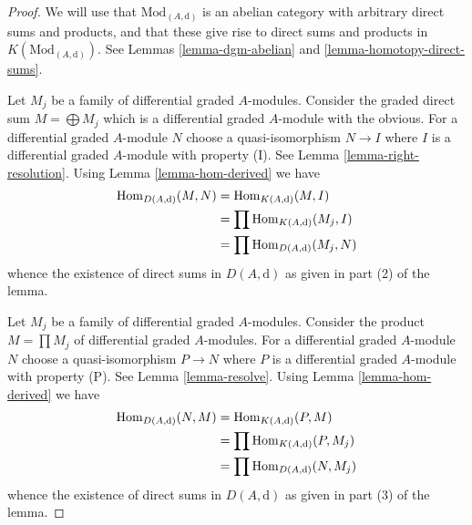 \begin{proof}
We will use that $\text{Mod}_{(A, \text{d})}$ is an abelian category
with arbitrary direct sums and products, and that these give rise
to direct sums and products in $K(\text{Mod}_{(A, \text{d})})$.
See Lemmas \ref{lemma-dgm-abelian} and \ref{lemma-homotopy-direct-sums}.

\medskip\noindent
Let $M_j$ be a family of differential graded $A$-modules.
Consider the graded direct sum $M = \bigoplus M_j$ which is a
differential graded $A$-module with the obvious.
For a differential graded $A$-module $N$ choose a quasi-isomorphism
$N \to I$ where $I$ is a differential graded $A$-module with property (I).
See Lemma \ref{lemma-right-resolution}.
Using Lemma \ref{lemma-hom-derived} we have
\begin{align*}
\mathop{\mathrm{Hom}}\nolimits_{D(A, \text{d})}(M, N)
& =
\mathop{\mathrm{Hom}}\nolimits_{K(A, \text{d})}(M, I) \\
& =
\prod \mathop{\mathrm{Hom}}\nolimits_{K(A, \text{d})}(M_j, I) \\
& =
\prod \mathop{\mathrm{Hom}}\nolimits_{D(A, \text{d})}(M_j, N)
\end{align*}
whence the existence of direct sums in $D(A, \text{d})$ as given in
part (2) of the lemma.

\medskip\noindent
Let $M_j$ be a family of differential graded $A$-modules.
Consider the product $M = \prod M_j$ of differential graded $A$-modules.
For a differential graded $A$-module $N$ choose a quasi-isomorphism
$P \to N$ where $P$ is a differential graded $A$-module with property (P).
See Lemma \ref{lemma-resolve}.
Using Lemma \ref{lemma-hom-derived} we have
\begin{align*}
\mathop{\mathrm{Hom}}\nolimits_{D(A, \text{d})}(N, M)
& =
\mathop{\mathrm{Hom}}\nolimits_{K(A, \text{d})}(P, M) \\
& =
\prod \mathop{\mathrm{Hom}}\nolimits_{K(A, \text{d})}(P, M_j) \\
& =
\prod \mathop{\mathrm{Hom}}\nolimits_{D(A, \text{d})}(N, M_j)
\end{align*}
whence the existence of direct sums in $D(A, \text{d})$ as given in
part (3) of the lemma.
\end{proof}

